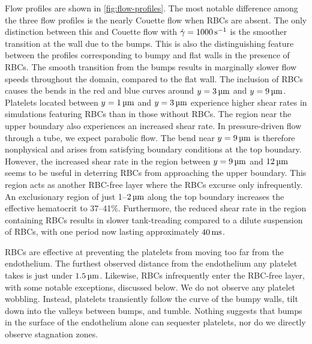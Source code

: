 Flow profiles are shown in \cref{fig:flow-profiles}. The most notable difference among the three flow profiles is
the nearly Couette flow when RBCs are absent. The only distinction between this and Couette flow with
$\shear=1000\persec$ is the smoother transition at the wall due to the bumps. This is also the distinguishing
feature between the profiles corresponding to bumpy and flat walls in the presence of RBCs. The smooth transition
from the bumps results in marginally slower flow speeds throughout the domain, compared to the flat wall. The
inclusion of RBCs causes the bends in the red and blue curves around $y = 3\um$ and $y = 9\um$. Platelets located
between $y=1\um$ and $y=3\um$ experience higher shear rates in simulations featuring RBCs than in those
without RBCs. The region near the upper boundary also experiences an increased shear rate. In pressure-driven flow
through a tube, we expect parabolic flow. The bend near $y = 9\um$ is therefore nonphysical and arises from
satisfying boundary conditions at the top boundary. However, the increased shear rate in the region between $y =
9\um$ and $12\um$ seems to be useful in deterring RBCs from approaching the upper boundary. This region acts as
another RBC-free layer where the RBCs excurse only infrequently. An exclusionary region of just 1--$2\um$ along
the top boundary increases the effective hematocrit to 37--41\%. Furthermore, the reduced shear rate in the region
containing RBCs results in slower tank-treading compared to a dilute suspension of RBCs, with one period now
lasting approximately $40\ms$.

RBCs are effective at preventing the platelets from moving too far from the endothelium. The furthest observed
distance from the endothelium any platelet takes is just under $1.5\um$. Likewise, RBCs infrequently enter the
RBC-free layer, with some notable exceptions, discussed below. We do not observe any platelet wobbling. Instead,
platelets transiently follow the curve of the bumpy walls, tilt down into the valleys between bumps, and tumble.
Nothing suggests that bumps in the surface of the endothelium alone can sequester platelets, nor do we directly
observe stagnation zones.

